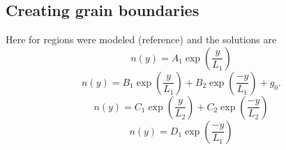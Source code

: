 \subsection{Creating grain boundaries}

Here for regions were modeled (reference) and the solutions are 
\begin{equation} \label{eqtng1}
 n(y) = A_1\exp \left(\frac{y}{L_1}\right)
\end{equation}
\begin{equation} \label{eqtng2}
 n(y) =  B_1\exp \left(\frac{y}{L_1}\right) + B_2\exp \left(\frac{-y}{L_1}\right) + g_0.
\end{equation}
\begin{equation} \label{eqtng3}
 n(y) = C_1\exp \left(\frac{y}{L_2}\right) + C_2\exp \left(\frac{-y}{L_2}\right) 
\end{equation} 
\begin{equation} \label{eqtng4}
 n(y) = D_1\exp \left(\frac{-y}{L_1}\right)
\end{equation}


